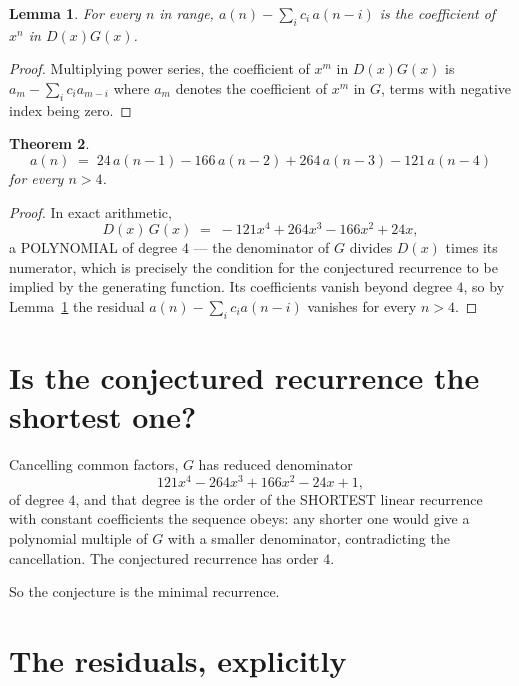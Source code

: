 \documentclass[11pt,a4paper]{article}
\theoremstyle{plain}
\newtheorem{theorem}{Theorem}
\newtheorem{lemma}[theorem]{Lemma}
\theoremstyle{definition}
\begin{document}
\begin{lemma}\label{lem:key}
For every $n$ in range, $a(n)-\sum_i c_i\,a(n-i)$ is the coefficient of $x^{n}$ in
$D(x)G(x)$.
\end{lemma}

\begin{proof}
Multiplying power series, the coefficient of $x^{m}$ in $D(x)G(x)$ is
$a_m-\sum_i c_i a_{m-i}$ where $a_m$ denotes the coefficient of $x^{m}$ in $G$, terms with
negative index being zero.
\end{proof}

\begin{theorem}
\[
a(n)\;=\;24\,a(n-1) - 166\,a(n-2) + 264\,a(n-3) - 121\,a(n-4)
\]
for every $n>4$.
\end{theorem}

\begin{proof}
In exact arithmetic,
\[
D(x)\,G(x)\;=\;- 121 x^{4} + 264 x^{3} - 166 x^{2} + 24 x,
\]
a POLYNOMIAL of degree $4$ --- the denominator of $G$ divides $D(x)$ times its numerator,
which is precisely the condition for the conjectured recurrence to be implied by the
generating function. Its coefficients vanish beyond degree $4$, so by
Lemma~\ref{lem:key} the residual $a(n)-\sum_ic_ia(n-i)$ vanishes for every
$n>4$.
\end{proof}

\section{Is the conjectured recurrence the shortest one?}

Cancelling common factors, $G$ has reduced denominator
\[
121 x^{4} - 264 x^{3} + 166 x^{2} - 24 x + 1,
\]
of degree $4$, and that degree is the order of the SHORTEST linear recurrence with
constant coefficients the sequence obeys: any shorter one would give a polynomial multiple of
$G$ with a smaller denominator, contradicting the cancellation. The conjectured recurrence has
order $4$.

So the conjecture is the minimal recurrence.

\section{The residuals, explicitly}
\end{document}
